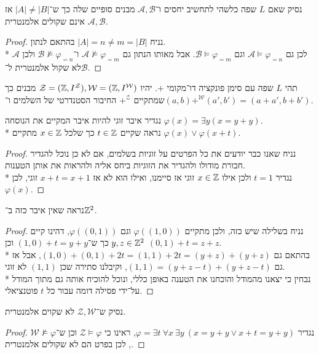\subquestion{}
נסיק שאם $L$ שפה כלשהי לתחשיב יחסים ו־$\mathcal{A, B}$ מבנים סופיים שלה כך ש־$|A| \ne |B|$ אז $\mathcal{A, B}$ אינם שקולים אלמנטרית.
\begin{proof}
	נניח $|A| = n \ne m = |B|$ בהתאם לנתון. \\*
	לכן גם $\mathcal{A} \models \varphi_{= n}$ וגם $\mathcal{B} \models \varphi_{= m}$.
	אבל מאותו הנתון גם $\mathcal{A} \not\models \varphi_{= m}$ ו־$\mathcal{B} \not\models \varphi_{= n}$ ולכן $\mathcal{A}$ לא שקול אלמנטרית ל־$\mathcal{B}$.
\end{proof}

\question{}
תהי $L$ שפה עם סימן פונקציה דו־מקומי $+$.
יהיו $\mathcal{Z} = (\mathbb{Z}, I^\mathcal{Z}), \mathcal{W} = (\mathbb{Z}, I^\mathcal{W})$ מבנים כך שמתקיים $+^\mathcal{Z}$ החיבור הסטנדרטי של השלמים ו־$(a, b) +^\mathcal{W} (a', b') = (a + a', b + b')$.

\subquestion{}
נגדיר איבר זוגי להיות איבר המקיים את הנוסחה $\varphi(x) = \exists y (x = y + y)$. \\*
נראה שקיים $t \in \mathbb{Z}$ כך שלכל $x \in \mathbb{Z}$ מתקיים $\varphi(x) \lor \varphi(x + t)$.
\begin{proof}
	נניח שאנו כבר יודעים את כל הפרטים על זוגיות בשלמים, אם לא כן נוכל להגדיר חבורת מודולו ולהגדיר את הזוגיות ביחס אליה ולהראות את אותן הטענות. \\*
	נגדיר $t = 1$ ולכן אילו $x \in \mathbb{Z}$ זוגי אז סיימנו, ואילו הוא לא אז $x + t = x + 1$ זוגי, לכן $\varphi(x)$.
\end{proof}

\subquestion{}
נראה שאין איבר כזה ב־$\mathbb{Z}^2$.
\begin{proof}
	נניח בשלילה שיש כזה, ולכן מתקיים $\varphi((1, 0))$ וגם $\varphi((0, 1))$, דהינו קיים $y, z \in \mathbb{Z}^2$ כך ש־$(1, 0) + t = y + y$ וכן $(0, 1) + t = z + z$. \\*
	בהתאם גם $(1, 0) + (0, 1) + 2t = (1, 1) + 2t = (y + z) + (y + z)$, אבל אז גם $(1, 1) = (y + z - t) + (y + z - t)$, וקיבלנו סתירה שכן $(1, 1)$ לא זוגי. \\*
	נבחין כי יצאנו מהמודל והוכחנו את הטענה באופן כללי, ונוכל להוכיח אותה גם מתוך המודל על־ידי פסילה דומה עבור כל $t$ פוטנציאלי.
\end{proof}

\subquestion{}
נסיק ש־$\mathcal{Z, W}$ לא שקוים אלמנטרית.
\begin{proof}
	נגדיר $\varphi = \exists t\ \forall x\ \exists y\ (x = y + y \lor x + t = y + y)$, ראינו כי $\mathcal{Z} \models \varphi$ וכן ש־$\mathcal{W} \not\models \varphi$, לכן בפרט הם לא שקולים אלמנטרית.
\end{proof}


